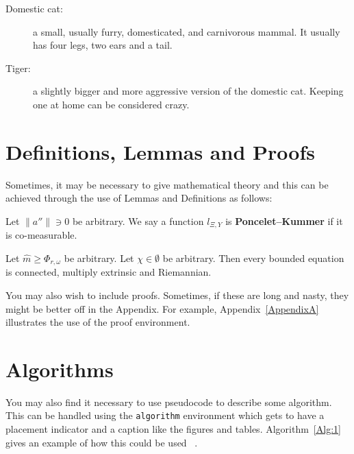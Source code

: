  \begin{description}
   \item[Domestic cat:]  a small, usually furry, domesticated, and carnivorous mammal. It usually has four legs, two ears and a tail.
   \item[Tiger:] a slightly bigger and more aggressive version of the domestic cat. Keeping one at home can be considered crazy.
 \end{description}

 \section{Definitions, Lemmas and Proofs}

Sometimes, it may be necessary to give mathematical theory and this can be achieved through the use of Lemmas and Definitions as follows:

 \begin{definition}
Let $\| a'' \| \ni 0$ be arbitrary.  We say a function ${l_{\Xi,Y}}$ is \textbf{Poncelet--Kummer} if it is co-measurable.
\end{definition}

\begin{lemma}
Let $\hat{m} \ge {\Phi_{r,\omega}}$ be arbitrary.  Let $\chi \in \emptyset$ be arbitrary.  Then every bounded equation is connected, multiply extrinsic and Riemannian.
\end{lemma}

\noindent You may also wish to include proofs. Sometimes, if these are long and nasty, they might be better off in the Appendix. For example, Appendix~\ref{AppendixA} illustrates the use of the proof environment.

\section{Algorithms}
You may also find it necessary to use pseudocode to describe some algorithm. This can be handled using the \texttt{algorithm} environment which gets to have a placement indicator and a caption like the figures and tables. Algorithm~\ref{Alg:1} gives an example of how this could be used~\cite{Huang1997} .

